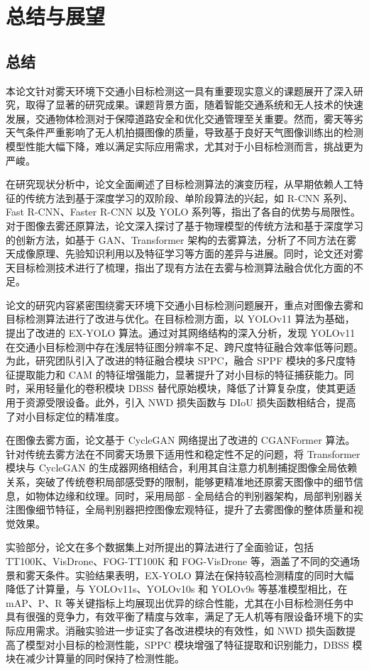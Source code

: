 \section{总结与展望\label{结论}}

\subsection{总结}

本论文针对雾天环境下交通小目标检测这一具有重要现实意义的课题展开了深入研究，取得了显著的研究成果。课题背景方面，随着智能交通系统和无人技术的快速发展，交通物体检测对于保障道路安全和优化交通管理至关重要。然而，雾天等劣天气条件严重影响了无人机拍摄图像的质量，导致基于良好天气图像训练出的检测模型性能大幅下降，难以满足实际应用需求，尤其对于小目标检测而言，挑战更为严峻。

在研究现状分析中，论文全面阐述了目标检测算法的演变历程，从早期依赖人工特征的传统方法到基于深度学习的双阶段、单阶段算法的兴起，如 R-CNN 系列、Fast R-CNN、Faster R-CNN 以及 YOLO 系列等，指出了各自的优势与局限性。对于图像去雾还原算法，论文深入探讨了基于物理模型的传统方法和基于深度学习的创新方法，如基于 GAN、Transformer 架构的去雾算法，分析了不同方法在雾天成像原理、先验知识利用以及特征学习等方面的差异与进展。同时，论文还对雾天目标检测技术进行了梳理，指出了现有方法在去雾与检测算法融合优化方面的不足。

论文的研究内容紧密围绕雾天环境下交通小目标检测问题展开，重点对图像去雾和目标检测算法进行了改进与优化。在目标检测方面，以 YOLOv11 算法为基础，提出了改进的 EX-YOLO 算法。通过对其网络结构的深入分析，发现 YOLOv11 在交通小目标检测中存在浅层特征图分辨率不足、跨尺度特征融合效率低等问题。为此，研究团队引入了改进的特征融合模块 SPPC，融合 SPPF 模块的多尺度特征提取能力和 CAM 的特征增强能力，显著提升了对小目标的特征捕获能力。同时，采用轻量化的卷积模块 DBSS 替代原始模块，降低了计算复杂度，使其更适用于资源受限设备。此外，引入 NWD 损失函数与 DIoU 损失函数相结合，提高了对小目标定位的精准度。

在图像去雾方面，论文基于 CycleGAN 网络提出了改进的 CGANFormer 算法。针对传统去雾方法在不同雾天场景下适用性和稳定性不足的问题，将 Transformer 模块与 CycleGAN 的生成器网络相结合，利用其自注意力机制捕捉图像全局依赖关系，突破了传统卷积局部感受野的限制，能够更精准地还原雾天图像中的细节信息，如物体边缘和纹理。同时，采用局部 - 全局结合的判别器架构，局部判别器关注图像细节特征，全局判别器把控图像宏观特征，提升了去雾图像的整体质量和视觉效果。

实验部分，论文在多个数据集上对所提出的算法进行了全面验证，包括 TT100K、VisDrone、FOG-TT100K 和 FOG-VisDrone 等，涵盖了不同的交通场景和雾天条件。实验结果表明，EX-YOLO 算法在保持较高检测精度的同时大幅降低了计算量，与 YOLOv11s、YOLOv10s 和 YOLOv9s 等基准模型相比，在 mAP、P、R 等关键指标上均展现出优异的综合性能，尤其在小目标检测任务中具有很强的竞争力，有效平衡了精度与效率，满足了无人机等有限设备环境下的实际应用需求。消融实验进一步证实了各改进模块的有效性，如 NWD 损失函数提高了模型对小目标的检测性能，SPPC 模块增强了特征提取和识别能力，DBSS 模块在减少计算量的同时保持了检测性能。

